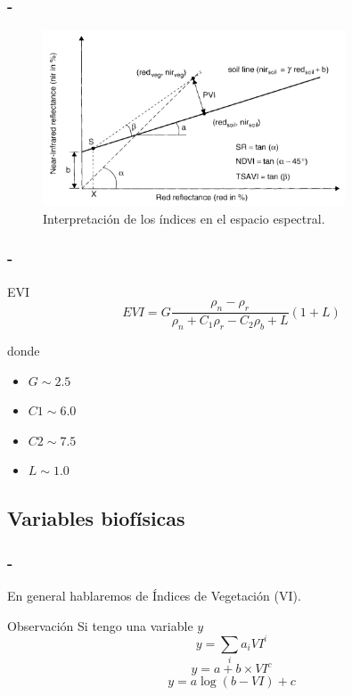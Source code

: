 \documentclass[handout]{beamer}
\begin{document}
\begin{frame}
    \frametitle{\secname-\subsecname}
    \begin{figure}
    \begin{center}
        \includegraphics[width=0.8\textwidth]{imagenes/int_graf.png}
    \end{center}
    \caption{Interpretaci\'on de los \'indices en el espacio espectral.}
    \label{fig:}
    \end{figure}
\end{frame}

\begin{frame}
    \frametitle{\secname-\subsecname}
    \begin{block}{EVI}
        \begin{equation}
            EVI = G\frac{\rho_n - \rho_r}{\rho_n+C_1\rho_r-C_2\rho_b+L}(1+L) 
        \end{equation}
    \end{block}
    donde
    \begin{itemize}
        \item $G  \sim 2.5$
        \item $C1 \sim 6.0$
        \item $C2 \sim 7.5$
        \item $L  \sim 1.0$
    \end{itemize}
\end{frame}

\subsection{Variables biof\'isicas}

\begin{frame}
    \frametitle{\secname-\subsecname}
    En general hablaremos de \'Indices de Vegetaci\'on (VI).\pause
    \begin{block}{Observaci\'on}
        Si tengo una variable $y$\pause
        \begin{equation}
            y = \sum_i a_i VI^i
        \end{equation}
        \begin{equation}
            y = a + b \times VI^c
        \end{equation}
        \begin{equation}
            y = a \log(b-VI)+c
        \end{equation}
    \end{block}
\end{frame}
\end{document}
